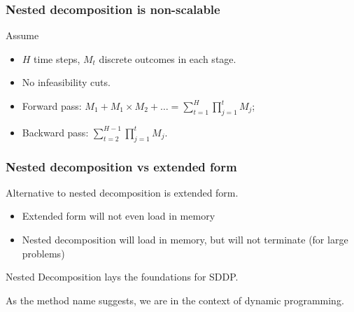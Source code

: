 \documentclass{beamer}
\begin{document}
\begin{frame}
\frametitle{Nested decomposition is non-scalable}

Assume
\begin{itemize}
\item
$H$ time steps, $M_t$ discrete outcomes in each stage.
\item
No infeasibility cuts.
\end{itemize}

\begin{center}
\begin{footnotesize}
\end{footnotesize}
\end{center}

\begin{itemize}
	\item 
Forward pass: $M_1 + M_1 \times M_2 + \ldots = \sum_{t = 1}^H \prod_{j = 1}^t M_j$;
	\item 
Backward pass:  $\sum_{t = 2}^{H-1} \prod_{j = 1}^t M_j$.
\end{itemize}

\end{frame}

\begin{frame}
	\frametitle{Nested decomposition vs extended form}
	
	Alternative to nested decomposition is extended form.
	\begin{itemize}
		\item 
		Extended form will not even load in memory
		\item 
		Nested decomposition will load in memory, but will not
		terminate (for large problems)
	\end{itemize}
	
	Nested Decomposition lays the foundations for SDDP.
	
	\mbox{}
	
	As the method name suggests, we are in the context of dynamic programming.
	
\end{frame}
\end{document}
